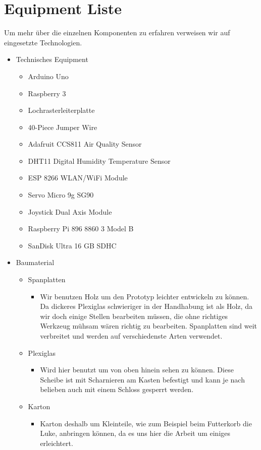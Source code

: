 \section{Equipment Liste}
Um mehr über die einzelnen Komponenten zu erfahren verweisen wir auf eingesetzte Technologien. 
\begin{itemize}
	\item Technisches Equipment
	\begin{itemize}
		\item Arduino Uno
		\item Raspberry 3
		\item Lochrasterleiterplatte
		\item 40-Piece Jumper Wire
		\item Adafruit CCS811 Air Quality Sensor
		\item DHT11 Digital Humidity Temperature Sensor
		\item ESP 8266 WLAN/WiFi Module
		\item Servo Micro 9g SG90
		\item Joystick Dual Axis Module
		\item Raspberry Pi 896 8860 3 Model B
		\item SanDisk Ultra 16 GB SDHC
	\end{itemize}
		\item Baumaterial
	\begin{itemize}
		\item Spanplatten
			\begin{itemize}
			\item Wir benutzen Holz um den Prototyp leichter entwickeln zu können. Da dickeres Plexiglas schwieriger in der Handhabung ist als Holz, da wir doch einige Stellen bearbeiten müssen, die ohne richtiges Werkzeug mühsam wären richtig zu bearbeiten. Spanplatten sind weit verbreitet und werden auf verschiedenste Arten verwendet.
		\end{itemize}
		\item Plexiglas
		\begin{itemize}
			\item Wird hier benutzt um von oben hinein sehen zu können. Diese Scheibe ist mit Scharnieren am Kasten befestigt und kann je nach belieben auch mit einem Schloss gesperrt werden.
		\end{itemize}
		\item Karton
		\begin{itemize}
			\item Karton deshalb um Kleinteile, wie zum Beispiel beim Futterkorb die Luke, anbringen können, da es uns hier die Arbeit um einiges erleichtert. 
		\end{itemize}
	\end{itemize}
\end{itemize}

